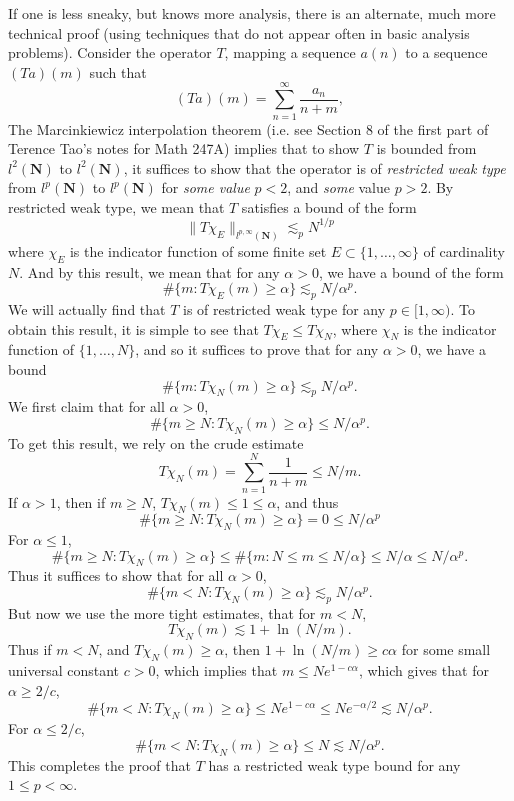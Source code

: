 \documentclass[answers]{exam}
\theoremstyle{problemstyle}
\newcommand{\1}[1]{\textbf{1}_{\left[#1\right]}} %
\begin{document}
\begin{questions}
\begin{solution}
	If one is less sneaky, but knows more analysis, there is an alternate, much more technical proof (using techniques that do not appear often in basic analysis problems). Consider the operator $T$, mapping a sequence $a(n)$ to a sequence $(Ta)(m)$ such that
	\[ (Ta)(m) = \sum_{n = 1}^\infty \frac{a_n}{n+m}, \]
	The Marcinkiewicz interpolation theorem (i.e. see Section 8 of the first part of Terence Tao's notes for Math 247A) implies that to show $T$ is bounded from $l^2(\mathbf{N})$ to $l^2(\mathbf{N})$, it suffices to show that the operator is of \emph{restricted weak type} from $l^p(\mathbf{N})$ to $l^p(\mathbf{N})$ for \emph{some value} $p < 2$, and \emph{some} value $p > 2$. By restricted weak type, we mean that $T$ satisfies a bound of the form
	\[ \| T \chi_E \|_{l^{p,\infty}(\mathbf{N})} \lesssim_p N^{1/p} \]
	where $\chi_E$ is the indicator function of some finite set $E \subset \{ 1,\dots, \infty \}$ of cardinality $N$. And by this result, we mean that for any $\alpha > 0$, we have a bound of the form
	\[ \# \{ m : T \chi_E (m) \geq \alpha \} \lesssim_p N / \alpha^p. \]
	We will actually find that $T$ is of restricted weak type for any $p \in [1,\infty)$. To obtain this result, it is simple to see that $T\chi_E \leq T\chi_N$, where $\chi_N$ is the indicator function of $\{ 1, \dots, N \}$, and so it suffices to prove that for any $\alpha > 0$, we have a bound
	\[ \# \{ m : T \chi_N(m) \geq \alpha \} \lesssim_p N / \alpha^p. \]
	We first claim that for all $\alpha > 0$,
	\[ \# \{ m \geq N : T \chi_N(m) \geq \alpha \} \leq N / \alpha^p. \]
	To get this result, we rely on the crude estimate
	\[ T \chi_N(m) = \sum_{n = 1}^N \frac{1}{n + m} \leq N/m. \]
	If $\alpha > 1$, then if $m \geq N$, $T \chi_N(m) \leq 1 \leq \alpha$, and thus
	\[ \# \{ m \geq N : T \chi_N(m) \geq \alpha \} = 0 \leq N / \alpha^p \]
	For $\alpha \leq 1$,
	\[ \# \{ m \geq N: T \chi_N(m) \geq \alpha \} \leq \# \{ m : N \leq m \leq N/\alpha \} \leq N / \alpha \leq N / \alpha^p. \]
	Thus it suffices to show that for all $\alpha > 0$,
	\[ \# \{ m < N : T \chi_N(m) \geq \alpha \} \lesssim_p N / \alpha^p. \]
	But now we use the more tight estimates, that for $m < N$,
	\[ T \chi_N(m) \lesssim 1 + \ln(N/m). \]
	Thus if $m < N$, and $T \chi_N(m) \geq \alpha$, then $1 + \ln(N/m) \geq c \alpha$ for some small universal constant $c > 0$, which implies that $m \leq N e^{1 - c \alpha}$, which gives that for $\alpha \geq 2/c$,
	\[ \# \{ m < N : T\chi_N(m) \geq \alpha \} \leq N e^{1 - c \alpha} \leq N e^{- \alpha / 2} \lesssim N / \alpha^p. \]
	For $\alpha \leq 2/c$,
	\[ \# \{ m < N : T\chi_N(m) \geq \alpha \} \leq N \lesssim N / \alpha^p. \]
	This completes the proof that $T$ has a restricted weak type bound for any $1 \leq p < \infty$.
\end{solution}

\end{questions}
\end{document}
